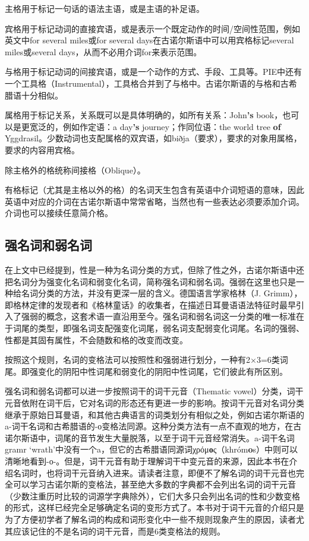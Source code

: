 主格用于标记一句话的语法主语，或是主语的补足语。

宾格用于标记动词的直接宾语，或是表示一个既定动作的时间/空间性范围，例如英文中for
several miles‌或for several days在古诺尔斯语中可以用宾格标记several
miles或several days，从而不必用介词for来表示范围。

与格用于标记动词的间接宾语，或是一个动作的方式、手段、工具等。PIE中还有一个工具格（Instrumental），工具格合并到了与格中。古诺尔斯语的与格和古希腊语十分相似。

属格用于标记关系，关系既可以是具体明确的，如所有关系：John\textbf{'s}
book，也可以是更宽泛的，例如作定语：a day\textbf{‌'s}
journey；作同位语：the world tree \textbf{of}
Yggdrasil。少数动词也支配属格的双宾语，如biðja（要求），要求的对象用属格，要求的内容用宾格。

除主格外的格统称间接格（Oblique）。

有格标记（尤其是主格以外的格）的名词天生包含有英语中介词短语的意味，因此英语中对应的介词在古诺尔斯语中常常省略，当然也有一些表达必须要添加介词。介词也可以接续任意简介格。

\subsection{强名词和弱名词}
在上文中已经提到，性是一种为名词分类的方式，但除了性之外，古诺尔斯语中还把名词分为强变化名词和弱变化名词，简称强名词和弱名词。强弱在这里也只是一种给名词分类的方法，并没有更深一层的含义。德国语言学家格林（J. Grimm），即格林定律的发现者和《格林童话》的收集者，在描述日耳曼语语法特征时最早引入了强弱的概念，这套术语一直沿用至今。强名词和弱名词这一分类的唯一标准在于词尾的类型，即强名词支配强变化词尾，弱名词支配弱变化词尾。名词的强弱、性都是其固有属性，不会随数和格的改变而改变。

按照这个规则，名词的变格法可以按照性和强弱进行划分，一种有2×3=6类词尾。即强变化的阴阳中性词尾和弱变化的阴阳中性词尾，它们彼此有所区别。

强名词和弱名词都可以进一步按照词干的词干元音（Thematic
vowel）分类，词干元音依附在词干后，它对名词的形态还有更进一步的影响。按词干元音对名词分类继承于原始日耳曼语，和其他古典语言的词类划分有相似之处，例如古诺尔斯语的a-词干名词和古希腊语的-ο变格法同源。这种分类方法有一点不直观的地方，在古诺尔斯语中，词尾的音节发生大量脱落，以至于词干元音经常消失。a-词干名词gramr
`wrath'中没有一个a，但它的古希腊语同源词χρόμ\textbf{ο}ς（khróm\textbf{o}s）中则可以清晰地看到-ο-。但是，词干元音有助于理解词干中变元音的来源，因此本书在介绍名词时，也将词干元音纳入进来。请读者注意，即便不了解名词的词干元音也完全可以学习古诺尔斯的变格法，甚至绝大多数的字典都不会列出名词的词干元音（少数注重历时比较的词源学字典除外），它们大多只会列出名词的性和少数变格的形式，这样已经完全足够确定名词的变形方式了。本书对于词干元音的介绍只是为了方便初学者了解名词的构成和词形变化中一些不规则现象产生的原因，读者尤其应该记住的不是名词的词干元音，而是6类变格法的规则。

